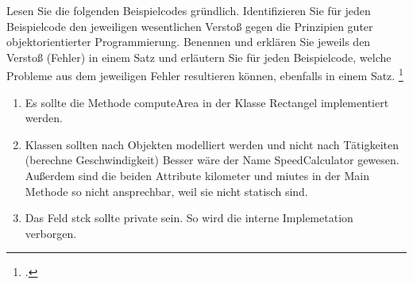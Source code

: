 \documentclass{bschlangaul-aufgabe}
\begin{document}

Lesen Sie die folgenden Beispielcodes gründlich. Identifizieren Sie für
jeden Beispielcode den jeweiligen wesentlichen Verstoß gegen die
Prinzipien guter objektorientierter Programmierung. Benennen und
erklären Sie jeweils den Verstoß (Fehler) in einem Satz und erläutern
Sie für jeden Beispielcode, welche Probleme aus dem jeweiligen Fehler
resultieren können, ebenfalls in einem Satz.
\footcite{examen:66116:2021:03}

\begin{enumerate}
\item {}

\begin{bAntwort}
Es sollte die Methode computeArea in der Klasse Rectangel implementiert
werden.
\end{bAntwort}

\item {}

\begin{bAntwort}
Klassen sollten nach Objekten modelliert werden und nicht nach
Tätigkeiten (berechne Geschwindigkeit) Besser wäre der Name
SpeedCalculator gewesen. Außerdem sind die beiden Attribute kilometer
und miutes in der Main Methode so nicht ansprechbar, weil sie nicht
statisch sind.
\end{bAntwort}

\item {}

\begin{bAntwort}
Das Feld stck sollte private sein. So wird die interne Implemetation
verborgen.
\end{bAntwort}
\end{enumerate}
\end{document}
